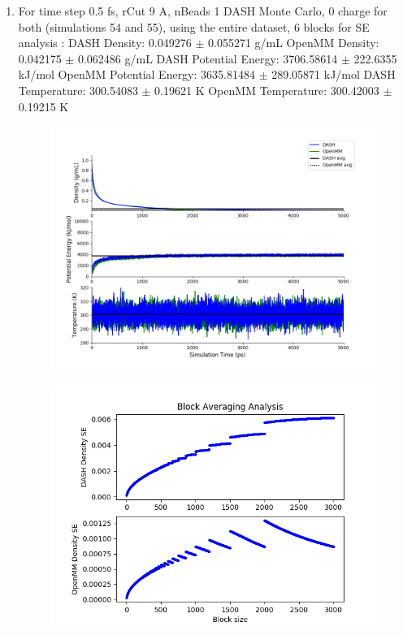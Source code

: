 \documentclass[12pt,reqno]{amsart}
\numberwithin{equation}{section}
\begin{document}
\begin{enumerate}
\item For time step 0.5 fs, rCut 9 A, nBeads 1 DASH Monte Carlo, 0 charge for both (simulations 54 and 55), using the entire dataset, 6 blocks for SE analysis :
\subitem DASH Density: 0.049276 $\pm$ 0.055271 g/mL
\subitem OpenMM Density: 0.042175 $\pm$ 0.062486 g/mL
\subitem DASH Potential Energy: 3706.58614 $\pm$ 222.6355 kJ/mol
\subitem OpenMM Potential Energy: 3635.81484 $\pm$ 289.05871 kJ/mol
\subitem DASH Temperature: 300.54083 $\pm$ 0.19621  K
\subitem OpenMM Temperature:  300.42003 $\pm$ 0.19215 K
\begin{figure}[H]
\centering
\includegraphics[scale=0.7]{MC-MM-0charge}
\end{figure} 
\begin{figure}[H]
\centering
\includegraphics[scale=0.7]{block_averaging_0charge}
\end{figure} 


\end{enumerate}
\end{document}

